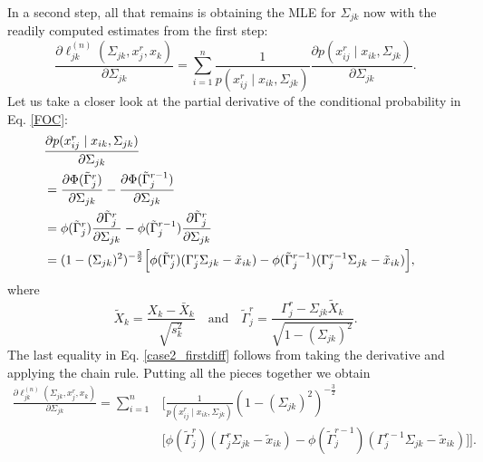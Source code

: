 In a second step, all that remains is obtaining the MLE for $\Sigma_{jk}$ now with the readily computed estimates from the first step:
\begin{equation}\label{FOC}
    \frac{\partial \ell_{jk}^{(n)}(\Sigma_{jk}, x_j^r,x_k)}{\partial \Sigma_{jk}} = \sum_{i=1}^n \frac{1}{p(x_{ij}^{r} \mid x_{ik}, \Sigma_{jk})} \frac{\partial p(x_{ij}^{r} \mid x_{ik}, \Sigma_{jk})}{\partial \Sigma_{jk}}.
\end{equation}
Let us take a closer look at the partial derivative of the conditional probability in Eq. \eqref{FOC}:
\begin{equation}\label{case2_firstdiff}
    \begin{split}
        \lefteqn{\frac{\partial p(x_{ij}^{r} \mid x_{ik}, \Sigma_{jk})}{\partial \Sigma_{jk}}} \\
        &= \frac{\partial \Phi({\tilde{\Gamma}}_j^{r})}{\partial \Sigma_{jk}} - \frac{\partial\Phi({\tilde{\Gamma}}_j^{r-1})}{\partial \Sigma_{jk}} \\
        &= \phi({\tilde{\Gamma}}_j^{r})\frac{\partial {\tilde{\Gamma}}_j^{r}}{\partial\Sigma_{jk}} - \phi({\tilde{\Gamma}}_j^{r-1})\frac{\partial {\tilde{\Gamma}}_j^{r}}{\partial\Sigma_{jk}} \\
        &= (1-(\Sigma_{jk})^2)^{-\frac{3}{2}}\Big[\phi({\tilde{\Gamma}}_j^{r})({\Gamma}_j^r\Sigma_{jk} - {\tilde{x}}_{ik}) - \phi({\tilde{\Gamma}}_j^{r-1})({\Gamma}_j^{r-1}\Sigma_{jk} - {\tilde{x}}_{ik})\Big],
    \end{split}
\end{equation}
where
\[{\tilde{X}}_{k} = \frac{X_{k} - \bar{X}_k}{\sqrt{s_k^2}} \quad \text{and} \quad {\tilde{\Gamma}}_j^{r} = \frac{{\Gamma}_j^{r} - \Sigma_{jk}{\tilde{X}}_k}{\sqrt{1-(\Sigma_{jk})^2}}.\]
The last equality in Eq. \eqref{case2_firstdiff} follows from taking the derivative and applying the chain rule. Putting all the pieces together we obtain
\begin{equation}\label{MLE_polyserial}
    \begin{split}
        \frac{\partial\ell_{jk}^{(n)}(\Sigma_{jk}, x_j^r,x_k)}{\partial \Sigma_{jk}} = \sum_{i=1}^n &\Bigg[\frac{1}{p(x_{ij}^{r} \mid x_{ik}, \Sigma_{jk})} (1-(\Sigma_{jk})^2)^{-\frac{3}{2}} \\
        &\Big[\phi({\tilde{\Gamma}}_j^{r})({\Gamma}_j^r\Sigma_{jk} - {\tilde{x}}_{ik}) - \phi({\tilde{\Gamma}}_j^{r-1})({\Gamma}_j^{r-1}\Sigma_{jk} - {\tilde{x}}_{ik})\Big]\Bigg].
    \end{split}
\end{equation}

